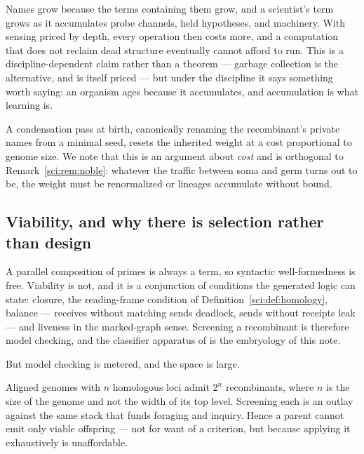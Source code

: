 \begin{remark}
\label{sci:rem:aging}
Names grow because the terms containing them grow, and a scientist's term grows as it accumulates
probe channels, held hypotheses, and machinery. With sensing priced by depth, every operation then
costs more, and a computation that does not reclaim dead structure eventually cannot afford to run.
This is a discipline-dependent claim rather than a theorem --- garbage collection is the alternative,
and is itself priced --- but under the discipline it says something worth saying: an organism ages
because it accumulates, and accumulation is what learning is.

A condensation pass at birth, canonically renaming the recombinant's private names from a minimal
seed, resets the inherited weight at a cost proportional to genome size. We note that this is an
argument about \emph{cost} and is orthogonal to Remark~\ref{sci:rem:noble}: whatever the traffic between
soma and germ turns out to be, the weight must be renormalized or lineages accumulate without bound.
\end{remark}

\subsection{Viability, and why there is selection rather than design}\label{sci:S12.8}
\label{sci:sec:viability}

A parallel composition of primes is always a term, so syntactic well-formedness is free. Viability is
not, and it is a conjunction of conditions the generated logic can state: closure, the reading-frame
condition of Definition~\ref{sci:def:homology}, balance --- receives without matching sends deadlock,
sends without receipts leak --- and liveness in the marked-graph sense. Screening a recombinant is
therefore model checking, and the classifier apparatus of \cite{ClassifierNote} is the embryology of
this note.

But model checking is metered, and the space is large.

\begin{proposition}
\label{sci:prop:selection}
Aligned genomes with $n$ homologous loci admit $2^n$ recombinants, where $n$ is the size of the genome
and not the width of its top level. Screening each is an outlay against the same stack that funds
foraging and inquiry. Hence a parent cannot emit only viable offspring --- not for want of a
criterion, but because applying it exhaustively is unaffordable.
\end{proposition}

